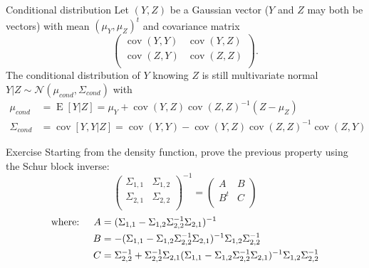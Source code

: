 \documentclass{beamer}
\DeclareMathOperator*{\E}{E}
\DeclareMathOperator*{\Cov}{cov}
\begin{document}
\begin{frame}{}
\begin{block}{Conditional distribution}
Let $(Y,Z)$ be a Gaussian vector ($Y$ and $Z$ may both be vectors) with mean $(\mu_Y,\mu_Z)^t$ and covariance matrix
\begin{equation*}
\begin{pmatrix}
	\Cov(Y,Y) & \Cov(Y,Z)\\
	\Cov(Z,Y) & \Cov(Z,Z)\\
\end{pmatrix}.
\end{equation*}
The conditional distribution of $Y$ knowing $Z$ is still multivariate normal $Y|Z \sim \mathcal{N}(\mu_{cond},\Sigma_{cond})$ with
\begin{equation*}
\begin{split}
	\mu_{cond} &= \E [Y|Z] = \mu_Y + \Cov(Y,Z) \Cov(Z,Z)^{-1} (Z-\mu_Z)\\ 
	\Sigma_{cond} &= \Cov [Y,Y|Z] = \Cov(Y,Y) - \Cov(Y,Z) \Cov(Z,Z)^{-1} \Cov(Z,Y)
\end{split}
\end{equation*}
\end{block}
\end{frame}

\begin{frame}{}
\begin{exampleblock}{Exercise}
	Starting from the density function, prove the previous property using the Schur block inverse:
\begin{equation*}
\begin{pmatrix}
	\Sigma_{1,1} & \Sigma_{1,2}\\
	\Sigma_{2,1} & \Sigma_{2,2}\\
\end{pmatrix}^{-1} = 
\begin{pmatrix}
	A & B\\
	B^t & C\\
\end{pmatrix}
\end{equation*}
\begin{equation*}
\begin{split}
 \text{where: \quad} A &= (\Sigma_{1,1} - \Sigma_{1,2} \Sigma_{2,2}^{-1} \Sigma_{2,1})^{-1}\\
 B &= -(\Sigma_{1,1} - \Sigma_{1,2} \Sigma_{2,2}^{-1} \Sigma_{2,1})^{-1}\Sigma_{1,2}\Sigma_{2,2}^{-1}\\
 C &= \Sigma_{2,2}^{-1} + \Sigma_{2,2}^{-1} \Sigma_{2,1} (\Sigma_{1,1} -\Sigma_{1,2} \Sigma_{2,2}^{-1} \Sigma_{2,1})^{-1}\Sigma_{1,2}\Sigma_{2,2}^{-1}
\end{split}
\end{equation*}
\end{exampleblock}
\end{frame}
\end{document}
